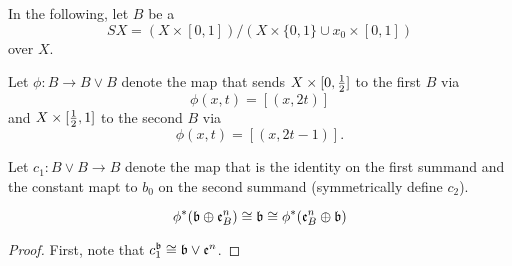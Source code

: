 \begin{myparagraph}
    In the following, let $B$ be a 
    \[ SX = (X \times [0, 1]) / (X \times \{ 0, 1 \} \cup x_0 \times [0, 1])\]
    over $X$.

    Let $\phi: B \to B \vee B$ denote the map that sends
    $X \times [0, \frac{1}{2}]$ to the first $B$ via
    \[ \phi(x, t) = [(x, 2t)] \]
    and $X \times [\frac{1}{2}, 1]$ to the second $B$ via
    \[ \phi(x, t) = [(x, 2t - 1)]. \]

    Let $c_1: B \vee B \to B$ denote the map that is the identity on the first summand
    and the constant mapt to $b_0$ on the second summand (symmetrically define $c_2$).
\end{myparagraph}

\begin{mylemma}\label{suspension::lemma1}
    \[ \phi^*(\mathfrak{b} \oplus \mathfrak{e}^n_B) \cong \mathfrak{b} \cong \phi^*(\mathfrak{e}^n_B \oplus \mathfrak{b}) \]
\end{mylemma}
\begin{proof}
    First, note that $c_1^{\mathfrak{b}} \cong \mathfrak{b} \vee \mathfrak{e}^n$.
\end{proof}